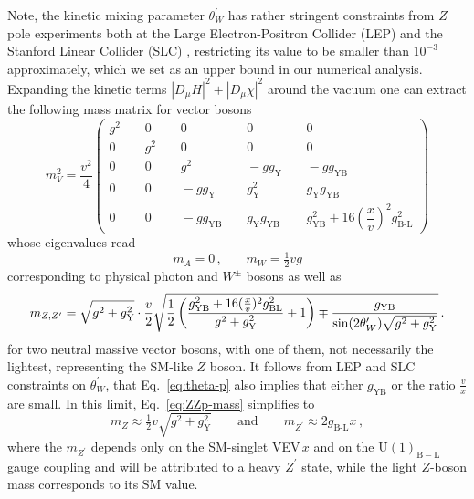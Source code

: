 \documentclass[a4paper,11pt]{article}
\newcommand{\vev}[0]{VEV}
\renewcommand{\(}{\left(}
\renewcommand{\)}{\right)}
\renewcommand{\[}{\left[}
\renewcommand{\]}{\right]}
\newcommand{\U}[1]{\mathrm{U}(1)_{\mathrm{#1}}}			%
\newcommand{\abs}[1]{\left| #1 \right| }
\newcommand{\ro}[1]{\textrm{#1}}
\begin{document}
Note, the kinetic mixing parameter $\theta_W^\prime$ has rather stringent constraints from $Z$ pole experiments both at the Large Electron-Positron Collider (LEP) \cite{ALEPH:2005ab} and the Stanford Linear Collider (SLC) \cite{Aaltonen:2010ws}, restricting its value to be smaller than $10^{-3}$ approximately, which we set as an upper bound in our numerical analysis. Expanding the kinetic terms $\abs{D_\mu H}^2 + \abs{D_\mu \chi}^2$ around the vacuum one can extract the following mass matrix for vector bosons
\begin{equation}
	m_V^2 =
	\dfrac{v^2}{4}
	\begin{pmatrix}
	g^2 \;\;&\;\; 0 \;\;&\;\; 0 \;\;&\;\; 0 \;\;&\;\; 0 \\
	0 \;\;&\;\; g^2 \;\;&\;\; 0 \;\;&\;\; 0 \;\;&\;\; 0 \\
	0 \;\;&\;\; 0 \;\;&\;\; g^2 \;\;&\;\; -g g_\ro{Y} \;\;&\;\; -g g_\ro{YB} \\
	0 \;\;&\;\; 0 \;\;&\;\; -g g_\ro{Y} \;\;&\;\; g_\ro{Y}^2 \;\;&\;\; g_\ro{Y} g_\ro{YB} \\
	0 \;\;&\;\; 0 \;\;&\;\; -g g_\ro{YB} \;\;&\;\; g_\ro{Y} g_\ro{YB} \;\;&\;\; g_\ro{YB}^2 + 16 \(\dfrac{x}{v}\)^2 g_\ro{B-L}^2
	\end{pmatrix}
\end{equation}
%
whose eigenvalues read
\begin{equation}
	m_A = 0 \, \text{,} \qquad m_W = \tfrac{1}{2} v g
\end{equation}
corresponding to physical photon and $W^\pm$ bosons as well as
\begin{equation}
m_{Z,Z^\prime}=\sqrt{g^2 + g^2_\ro{Y}} \cdot \frac{v}{2}  \sqrt{\frac{1}{2} \left( \frac{g_\ro{YB}^2 + 16 (\frac{x}{v})^2 g^2_{\rm BL} }{g^2 + g^2_{\rm Y}} +1  \right) \mp \frac{g_\ro{YB}}{\sin(2 \theta_W^\prime) \sqrt{g^2 + g^2_{\rm Y}}}}\,.
\label{eq:ZZp-mass}
\end{equation}
for two neutral massive vector bosons, with one of them, not necessarily the lightest, representing the SM-like $Z$ boson. It follows from LEP and SLC constraints on $\theta_W^\prime$, that Eq.~\eqref{eq:theta-p} also implies that either $g_\ro{YB}$ or the ratio $\tfrac{v}{x}$ are small. In this limit, Eq.~\eqref{eq:ZZp-mass} simplifies to
\begin{equation}
	m_Z \approx \tfrac{1}{2} v \sqrt{g^2 + g_\ro{Y}^2} \qquad \text{and} \qquad m_{Z^\prime} \approx 2 g_\ro{B-L} x\,,
	\label{eq:mZ}
\end{equation}
%
where the $m_{Z^\prime}$ depends only on the SM-singlet \vev\,$x$ and on the $\U{B-L}$ gauge coupling and will be attributed to a heavy $Z^\prime$ state, while the light $Z$-boson mass corresponds to its SM value.
\end{document}
